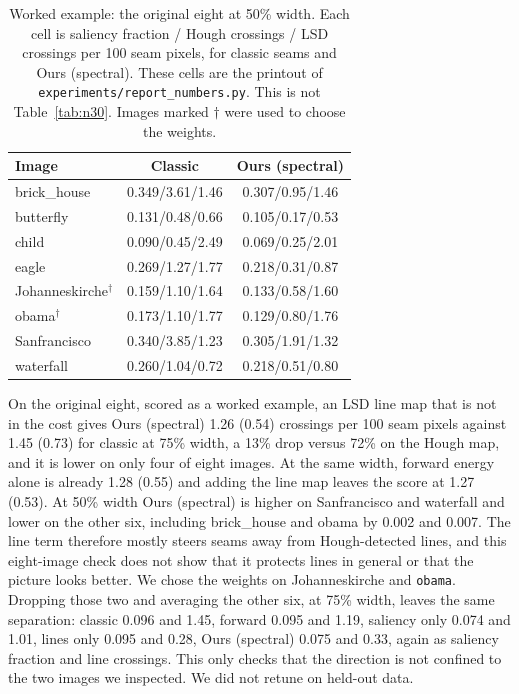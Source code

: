 \documentclass[10pt,twocolumn,letterpaper]{article}
\begin{document}
\begin{table}[t]
\centering
\caption{Worked example: the original eight at 50\% width. Each cell is saliency fraction / Hough crossings / LSD crossings per 100 seam pixels, for classic seams and Ours (spectral). These cells are the printout of \texttt{experiments/report\_numbers.py}. This is not Table~\ref{tab:n30}. Images marked $\dagger$ were used to choose the weights.}
\label{tab:width50img}
\scriptsize
\begin{tabular}{lcc}
\toprule
Image & Classic & Ours (spectral) \\
\midrule
brick\_house & 0.349/3.61/1.46 & 0.307/0.95/1.46 \\
butterfly & 0.131/0.48/0.66 & 0.105/0.17/0.53 \\
child & 0.090/0.45/2.49 & 0.069/0.25/2.01 \\
eagle & 0.269/1.27/1.77 & 0.218/0.31/0.87 \\
Johanneskirche$^\dagger$ & 0.159/1.10/1.64 & 0.133/0.58/1.60 \\
obama$^\dagger$ & 0.173/1.10/1.77 & 0.129/0.80/1.76 \\
Sanfrancisco & 0.340/3.85/1.23 & 0.305/1.91/1.32 \\
waterfall & 0.260/1.04/0.72 & 0.218/0.51/0.80 \\
\bottomrule
\end{tabular}
\end{table}

On the original eight, scored as a worked example, an LSD line map that is not in the cost gives Ours (spectral) 1.26 (0.54) crossings per 100 seam pixels against 1.45 (0.73) for classic at 75\% width, a 13\% drop versus 72\% on the Hough map, and it is lower on only four of eight images.
At the same width, forward energy alone is already 1.28 (0.55) and adding the line map leaves the score at 1.27 (0.53).
At 50\% width Ours (spectral) is higher on Sanfrancisco and waterfall and lower on the other six, including brick\_house and obama by 0.002 and 0.007.
The line term therefore mostly steers seams away from Hough-detected lines, and this eight-image check does not show that it protects lines in general or that the picture looks better.
We chose the weights on Johanneskirche and \texttt{obama}.
Dropping those two and averaging the other six, at 75\% width, leaves the same separation: classic 0.096 and 1.45, forward 0.095 and 1.19, saliency only 0.074 and 1.01, lines only 0.095 and 0.28, Ours (spectral) 0.075 and 0.33, again as saliency fraction and line crossings.
This only checks that the direction is not confined to the two images we inspected.
We did not retune on held-out data.
\end{document}
